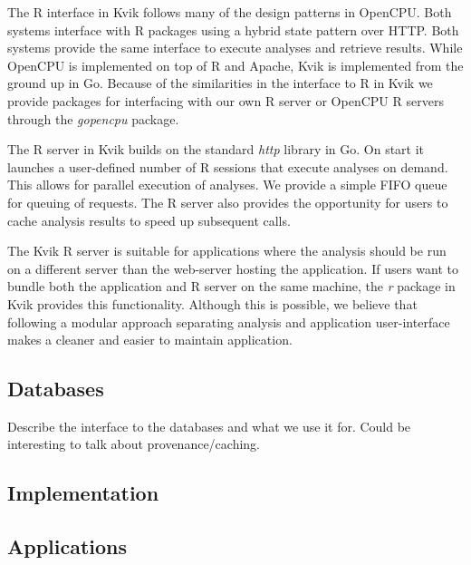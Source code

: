 The R interface in Kvik follows many of the design patterns in OpenCPU. Both
systems interface with R packages using a hybrid state pattern over HTTP. Both
systems provide the same interface to execute analyses and retrieve results.
While OpenCPU is implemented on top of R and Apache, Kvik is implemented from
the ground up in Go. Because of the similarities in the interface to R in Kvik
we provide packages for interfacing with our own R server or OpenCPU R servers
through the \emph{gopencpu} package. 

The R server in Kvik builds on the standard \emph{http} library in Go. On start
it launches a user-defined number of R sessions that execute analyses on demand.
This allows for parallel execution of analyses. We provide a simple FIFO queue
for queuing of requests. The R server also provides the opportunity for users to
cache analysis results to speed up subsequent calls. 

The Kvik R server is suitable for applications where the analysis should be run
on a different server than the web-server hosting the application. If users want
to bundle both the application and R server on the same machine, the \emph{r}
package in Kvik provides this functionality. Although this is possible, we
believe that following a modular approach separating analysis and
application user-interface makes a cleaner and easier to maintain application. 

\subsection*{Databases}
Describe the interface to the databases and what we use it for. Could be
interesting to talk about provenance/caching.

\subsection*{Implementation}

\subsection*{Applications}




